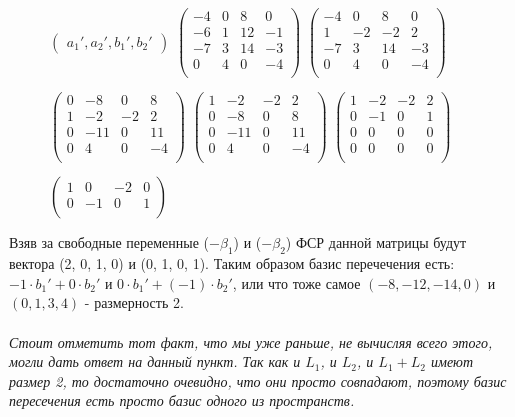 \documentclass[10pt]{article}
\begin{document}
\begin{figure}[H]
$\begin{pmatrix}
a_1',
a_2', 
b_1', 
b_2'
\end{pmatrix}$
\text{ = }
$\begin{pmatrix}
-4 & 0 & 8 & 0 \\
-6 & 1 & 12 & -1 \\
-7 & 3 & 14 & -3 \\
0 & 4 & 0 & -4 \\
\end{pmatrix}$
\text{ = }
$\begin{pmatrix}
-4 & 0 & 8 & 0 \\
1 & -2 & -2 & 2 \\
-7 & 3 & 14 & -3 \\
0 & 4 & 0 & -4 \\
\end{pmatrix}$
\text{ = }

\text{ = }
$\begin{pmatrix}
0 & -8 & 0 & 8 \\
1 & -2 & -2 & 2 \\
0 & -11 & 0 & 11 \\
0 & 4 & 0 & -4 \\
\end{pmatrix}$
\text{ = }
$\begin{pmatrix}
1 & -2 & -2 & 2 \\
0 & -8 & 0 & 8 \\
0 & -11 & 0 & 11 \\
0 & 4 & 0 & -4 \\
\end{pmatrix}$
\text{ = }
$\begin{pmatrix}
1 & -2 & -2 & 2 \\
0 & -1 & 0 & 1 \\
0 & 0 & 0 & 0 \\
0 & 0 & 0 & 0 \\
\end{pmatrix}$
\text{ = }

\text{ = }
$\begin{pmatrix}
1 & 0 & -2 & 0 \\
0 & -1 & 0 & 1 \\
\end{pmatrix}$
\end{figure}
Взяв за свободные переменные ($-\beta_1$) и ($-\beta_2$) ФСР данной матрицы будут вектора (2, 0, 1, 0) и (0, 1, 0, 1). Таким образом базис перечечения есть: $-1 \cdot b_1' + 0 \cdot b_2'$ и $0 \cdot b_1' + (-1)  \cdot b_2'$, или что тоже самое $(-8, -12, -14, 0)$ и $(0, 1, 3, 4)$ - размерность 2. \\ \\
\textit{Стоит отметить тот факт, что мы уже раньше, не вычисляя всего этого, могли дать ответ на данный пункт. Так как и $ L_1 $, и $ L_2 $, и $L_1 + L_2 $ имеют размер 2, то достаточно очевидно, что они просто совпадают, поэтому базис пересечения есть просто базис одного из пространств. }
\newpage
\end{document}
